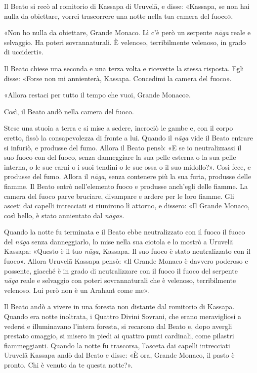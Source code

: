Il Beato si recò al romitorio di Kassapa di Uruvelā, e disse: «Kassapa,
se non hai nulla da obiettare, vorrei trascorrere una notte nella tua
camera del fuoco».


«Non ho nulla da obiettare, Grande Monaco. Lì c’è però un serpente
\emph{nāga} reale e selvaggio. Ha poteri sovrannaturali. È velenoso,
terribilmente velenoso, in grado di ucciderti».


Il Beato chiese una seconda e una terza volta e ricevette la stessa
risposta. Egli disse: «Forse non mi annienterà, Kassapa. Concedimi la
camera del fuoco».


«Allora restaci per tutto il tempo che vuoi, Grande Monaco».


Così, il Beato andò nella camera del fuoco.


Stese una stuoia a terra e si mise a sedere, incrociò le gambe e, con il
corpo eretto, fissò la consapevolezza di fronte a lui. Quando il \emph{nāga}
vide il Beato entrare si infuriò, e produsse del fumo. Allora il Beato
pensò: «E se io neutralizzassi il suo fuoco con del fuoco, senza
danneggiare la sua pelle esterna o la sua pelle interna, o le sue carni
o i suoi tendini o le sue ossa o il suo midollo?». Così fece, e produsse
del fumo. Allora il \emph{nāga}, senza contenere più la sua furia, produsse
delle fiamme. Il Beato entrò nell’elemento fuoco e produsse anch’egli
delle fiamme. La camera del fuoco parve bruciare, divampare e ardere per
le loro fiamme. Gli asceti dai capelli intrecciati si riunirono lì
attorno, e dissero: «Il Grande Monaco, così bello, è stato annientato
dal \emph{nāga}».


Quando la notte fu terminata e il Beato ebbe neutralizzato con il fuoco
il fuoco del \emph{nāga} senza danneggiarlo, lo mise nella sua ciotola e lo
mostrò a Uruvelā Kassapa: «Questo è il tuo \emph{nāga}, Kassapa. Il suo fuoco
è stato neutralizzato con il fuoco». Allora Uruvelā Kassapa pensò: «Il
Grande Monaco è davvero poderoso e possente, giacché è in grado di
neutralizzare con il fuoco il fuoco del serpente \emph{nāga} reale e
selvaggio con poteri sovrannaturali che è velenoso, terribilmente
velenoso. Lui però non è un Arahant come me».


Il Beato andò a vivere in una foresta non distante dal romitorio di
Kassapa. Quando era notte inoltrata, i Quattro Divini Sovrani, che erano
meravigliosi a vedersi e illuminavano l’intera foresta, si recarono dal
Beato e, dopo avergli prestato omaggio, si misero in piedi ai quattro
punti cardinali, come pilastri fiammeggianti. Quando la notte fu
trascorsa, l’asceta dai capelli intrecciati Uruvelā Kassapa andò dal
Beato e disse: «È ora, Grande Monaco, il pasto è pronto. Chi è venuto da
te questa notte?».


